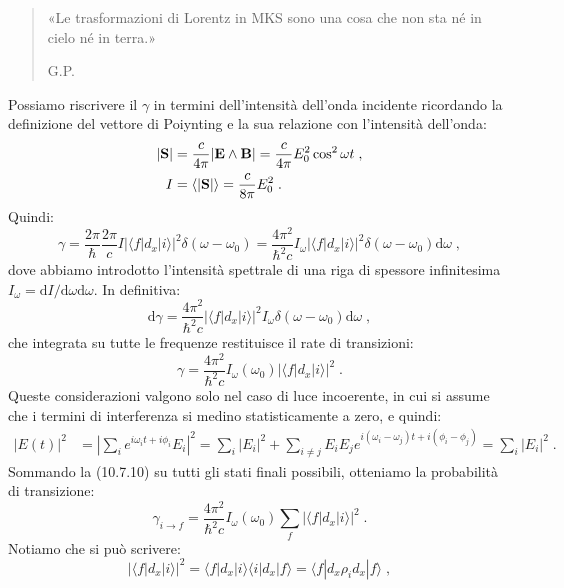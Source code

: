\documentclass[12pt,a4paper]{report}
\theoremstyle{definition}
\numberwithin{equation}{section}
\newcommand{\diff}[1][]{\mathrm{d}#1}
\newcommand{\bra}{\langle}
\newcommand{\ket}{\rangle}
\begin{document}
\begin{quote}
«Le trasformazioni di Lorentz in MKS sono una cosa che non sta né in cielo né in terra.»
\begin{flushright}
G.P.
\end{flushright}
\end{quote}
Possiamo riscrivere il $\gamma$ in termini dell'intensità dell'onda incidente ricordando la definizione del vettore di Poiynting e la sua relazione con l'intensità dell'onda:
\begin{align}
|\mathbf{S}| &= \frac{c}{4\pi}|\mathbf{E}\wedge\mathbf{B}|=\frac{c}{4\pi}E_0^2\cos^2\omega t \notag\;, \\
I&=\bra |\mathbf{S}|\ket=\frac{c}{8\pi}E_0^2\;.
\end{align}
Quindi:
\begin{equation}
\gamma=\frac{2\pi}{\hbar}\frac{2\pi}{c}I|\bra f|d_x|i\ket|^2\delta(\omega-\omega_0)=\frac{4\pi^2}{\hbar^2c}I_{\omega}|\bra f|d_x|i\ket|^2\delta(\omega-\omega_0)\diff{\omega}\;,
\end{equation}
dove abbiamo introdotto l'intensità spettrale di una riga di spessore infinitesima $I_{\omega}=\diff{I}/\diff{\omega}\diff{\omega}$. In definitiva:
\begin{equation}
\diff{\gamma}=\frac{4\pi^2}{\hbar^2c}|\bra f|d_x|i\ket|^2I_{\omega}\delta(\omega-\omega_0)\diff{\omega}\;,
\end{equation}
che integrata su tutte le frequenze restituisce il rate di transizioni:
\begin{equation}
\gamma=\frac{4\pi^2}{\hbar^2 c}I_{\omega}(\omega_0)|\bra f|d_x|i\ket|^2\;.
\end{equation}
Queste considerazioni valgono solo nel caso di luce incoerente, in cui si assume che i termini di interferenza si medino statisticamente a zero, e quindi:
\begin{align}
|E(t)|^2 &= \left|\sum_i e^{i\omega_it+i\phi_i}E_i\right|^2= \sum_i |E_i|^2+\sum_{i\ne j} E_iE_j e^{i(\omega_i-\omega_j)t+i(\phi_i-\phi_j)}=  \sum_i |E_i|^2\;.
\end{align}
Sommando la (10.7.10) su tutti gli stati finali possibili, otteniamo la probabilità di transizione:
\begin{equation}
\gamma_{i\to f}=\frac{4\pi^2}{\hbar^2 c}I_{\omega}(\omega_0)\sum_f |\bra f|d_x|i\ket|^2\;.
\end{equation}
Notiamo che si può scrivere:
\begin{equation}
|\bra f|d_x|i\ket|^2=\bra f|d_x|i\ket\bra i|d_x|f\ket=\bra f|d_x \rho_i d_x|f\ket\;,
\end{equation}
\end{document}
